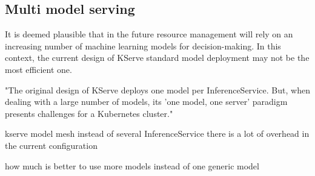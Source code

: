 \subsection{Multi model serving}

It is deemed plausible that in the future resource management will rely on an increasing number of machine learning models for decision-making.
In this context, the current design of KServe standard model deployment may not be the most efficient one.

"The original design of KServe deploys one model per InferenceService. But, when dealing with a large number of models, its 'one model, one server' paradigm presents challenges for a Kubernetes cluster."

kserve model mesh instead of several InferenceService
there is a lot of overhead in the current configuration

how much is better to use more models instead of one generic model 




\newpage
